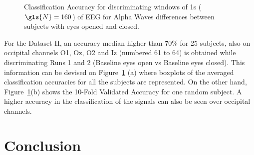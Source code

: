\begin{figure}[h!]
\centering
{}
\caption[Alpha Waves Classification]{Classification Accuracy for discriminating windows of 1s ($\gls{N} = 160$) of EEG for Alpha Waves differences between subjects with eyes opened and closed.}
\label{fig:alpharesultsdatasetii}
\end{figure}


For the Dataset II, an accuracy median higher than $70\%$ for 25 subjects, also on occipital channels O1, Oz, O2 and Iz (numbered 61 to 64) is obtained while discriminating Runs 1 and 2 (Baseline eyes open vs Baseline eyes closed).  This information can be devised on Figure~\ref{fig:alpharesultsdatasetii}   (a) where boxplots of the averaged classification accuracies for all the subjects are represented.  On the other hand, Figure~\ref{fig:alpharesultsdatasetii}(b) shows the 10-Fold Validated Accuracy for one random subject. A higher accuracy in the classification of the signals can also be seen over occipital channels.

\section{Conclusion}

